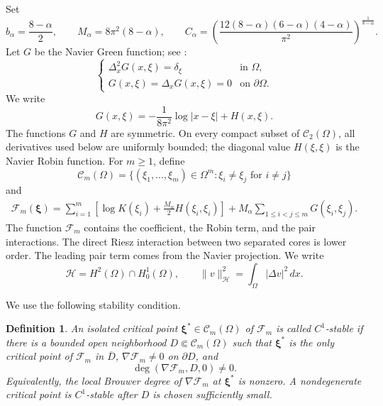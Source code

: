 \documentclass[11pt]{article}
\newtheorem{definition}[theorem]{Definition}
\numberwithin{equation}{section}
\begin{document}
Set
\begin{equation*}
b_\alpha=\frac{8-\alpha}{2},
\qquad M_\alpha=8\pi^2(8-\alpha),
\qquad
C_\alpha=
\left(\frac{12(8-\alpha)(6-\alpha)(4-\alpha)}{\pi^2}\right)^{\!\frac1{8-\alpha}}.
\end{equation*}
Let $G$ be the Navier Green function; see \cite{GazzolaGrunauSweers}:
\begin{equation*}
\begin{cases}
\Delta_x^2G(x,\xi)=\delta_\xi&\text{in }\Omega,\\
G(x,\xi)=\Delta_xG(x,\xi)=0&\text{on }\partial\Omega.
\end{cases}
\end{equation*}
We write
\begin{equation*}
G(x,\xi)=-\frac1{8\pi^2}\log|x-\xi|+H(x,\xi).
\end{equation*}
The functions $G$ and $H$ are symmetric. On every compact subset of
$\mathcal C_2(\Omega)$, all derivatives used below are uniformly
bounded; the diagonal value $H(\xi,\xi)$ is the Navier Robin
function.
For $m\geq1$, define
\begin{equation*}
\mathcal C_m(\Omega)
=\{(\xi_1,\ldots,\xi_m)\in\Omega^m:\xi_i\neq\xi_j\text{ for }i\neq j\}
\end{equation*}
and
\begin{equation*}
\begin{aligned}
\mathcal F_m(\boldsymbol\xi)
={}\sum_{i=1}^m
\left[\log K(\xi_i)+\frac{M_\alpha}{2}H(\xi_i,\xi_i)\right]+M_\alpha\sum_{1\leq i<j\leq m}G(\xi_i,\xi_j).
\end{aligned}
\end{equation*}
The function $\mathcal F_m$ contains the coefficient, the Robin term,
and the pair interactions. The direct Riesz interaction between two
separated cores is lower order. The leading pair term comes from the
Navier projection. We write
\[
\mathcal H=H^2(\Omega)\cap H_0^1(\Omega),
\qquad
\|v\|_{\mathcal H}^2=\int_\Omega|\Delta v|^2\,dx.
\]

We use the following stability condition.

\begin{definition}\label{def:stable-critical-point}
An isolated critical point $\boldsymbol\xi^{*}\in\mathcal C_{m}(\Omega)$ of $\mathcal F_{m}$ is called $C^{1}$-stable if there is a bounded open neighborhood $D\Subset\mathcal C_{m}(\Omega)$ such that $\boldsymbol\xi^{*}$ is the only critical point of $\mathcal F_m$ in $\overline D$, $\nabla\mathcal F_{m}\neq0$ on $\partial D$, and
\[
\deg(\nabla\mathcal F_{m},D,0)\neq0.
\]
Equivalently, the local Brouwer degree of $\nabla\mathcal F_m$ at $\boldsymbol\xi^*$ is nonzero. A nondegenerate critical point is $C^{1}$-stable after $D$ is chosen sufficiently small.
\end{definition}
\end{document}
